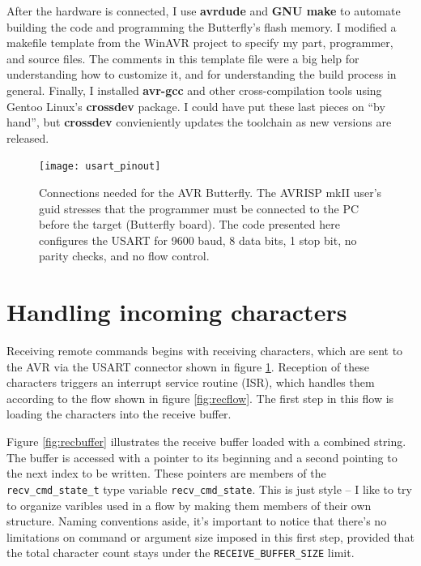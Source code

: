 After the hardware is connected, I use \textbf{avrdude}\cite{avrdude} and \textbf{GNU make}\cite{gnumake} to automate building the code and programming the Butterfly's flash memory.  I modified a makefile template from the WinAVR project\cite{winavr} to specify my part, programmer, and source files.  The comments in this template file were a big help for understanding how to customize it, and for understanding the build process in general.  Finally, I installed \textbf{avr-gcc} and other cross-compilation tools using Gentoo Linux's \textbf{crossdev} package.  I could have put these last pieces on ``by hand'', but \textbf{crossdev} convieniently updates the toolchain as new versions are released.     

\begin{figure}[ht]
    \begin{center}
        \texttt{[image: usart\_pinout]}
        \caption{Connections needed for the AVR Butterfly.  The AVRISP mkII user's guid stresses that the programmer must be connected to the PC before the target (Butterfly board).  The code presented here configures the USART for 9600 baud, 8 data bits, 1 stop bit, no parity checks, and no flow control. \label{fig:connections}}
    \end{center}
\end{figure}

\clearpage
\section{Handling incoming characters}
Receiving remote commands begins with receiving characters, which are sent to the AVR via the USART connector shown in figure \ref{fig:connections}.  Reception of these characters triggers an interrupt service routine (ISR), which handles them according to the flow shown in figure \ref{fig:recflow}. The first step in this flow is loading the characters into the receive buffer.

Figure \ref{fig:recbuffer} illustrates the receive buffer loaded with a combined string.  The buffer is accessed with a pointer to its beginning and a second pointing to the next index to be written.  These pointers are members of the \texttt{recv\_cmd\_state\_t} type variable \texttt{recv\_cmd\_state}.  This is just style -- I like to try to organize varibles used in a flow by making them members of their own structure.  Naming conventions aside, it's important to notice that there's no limitations on command or argument size imposed in this first step, provided that the total character count stays under the \texttt{RECEIVE\_BUFFER\_SIZE} limit. 
 

